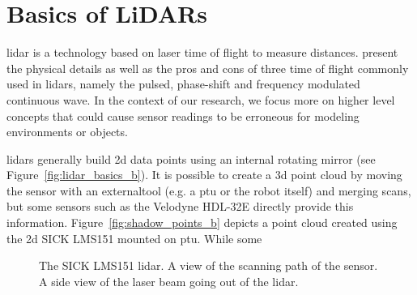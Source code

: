 \section{Basics of LiDARs}
\label{sec:chap_lidar_basics}

\gls*{lidar} is a technology based on laser time of flight to measure distances. \citet{lidar_basics} present the physical details as well as the pros and cons of three time of flight commonly used in \gls*{lidar}s, namely the pulsed, phase-shift and frequency modulated continuous wave. In the context of our research, we focus more on higher level concepts that could cause sensor readings to be erroneous for modeling environments or objects. 

\gls*{lidar}s generally build \gls*{2d} data points using an internal rotating mirror (see Figure~\ref{fig:lidar_basics_b}). It is possible to create a \gls*{3d} point cloud by moving the sensor with an externaltool (e.g. a \gls*{ptu} or the robot itself) and merging scans, but some sensors such as the Velodyne HDL-32E directly provide this information. Figure~\ref{fig:shadow_points_b} depicts a point cloud created using the \gls*{2d} SICK LMS151 mounted on \gls*{ptu}. While some

\begin{figure}[h]
    \centering
    \caption[Example of a \gls*{lidar} device and simplified representation of the laser trajectory.]{\protect{} The SICK LMS151 \gls*{lidar}. \protect{} A view of the scanning path of the sensor. \protect{} A side view of the laser beam going out of the \gls*{lidar}.}
    \label{fig:lidar_basics}
\end{figure}

